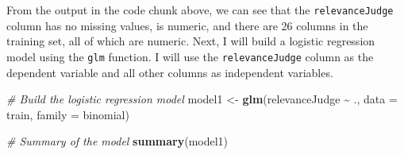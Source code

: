 \documentclass[
]{article}
\newenvironment{Shaded}{\begin{snugshade}}{\end{snugshade}}
\newcommand{\AttributeTok}[1]{\textcolor[rgb]{0.13,0.29,0.53}{#1}}
\newcommand{\CommentTok}[1]{\textcolor[rgb]{0.56,0.35,0.01}{\textit{#1}}}
\newcommand{\FunctionTok}[1]{\textcolor[rgb]{0.13,0.29,0.53}{\textbf{#1}}}
\newcommand{\NormalTok}[1]{#1}
\newcommand{\OtherTok}[1]{\textcolor[rgb]{0.56,0.35,0.01}{#1}}
\newcommand{\SpecialCharTok}[1]{\textcolor[rgb]{0.81,0.36,0.00}{\textbf{#1}}}
\begin{document}
From the output in the code chunk above, we can see that the
\texttt{relevanceJudge} column has no missing values, is numeric, and
there are 26 columns in the training set, all of which are numeric.
Next, I will build a logistic regression model using the \texttt{glm}
function. I will use the \texttt{relevanceJudge} column as the dependent
variable and all other columns as independent variables.

\begin{Shaded}
\begin{Highlighting}[]
\CommentTok{\# Build the logistic regression model}
\NormalTok{model1 }\OtherTok{\textless{}{-}} \FunctionTok{glm}\NormalTok{(relevanceJudge }\SpecialCharTok{\textasciitilde{}}\NormalTok{ ., }\AttributeTok{data =}\NormalTok{ train, }\AttributeTok{family =}\NormalTok{ binomial)}

\CommentTok{\# Summary of the model}
\FunctionTok{summary}\NormalTok{(model1)}
\end{Highlighting}
\end{Shaded}
\end{document}
